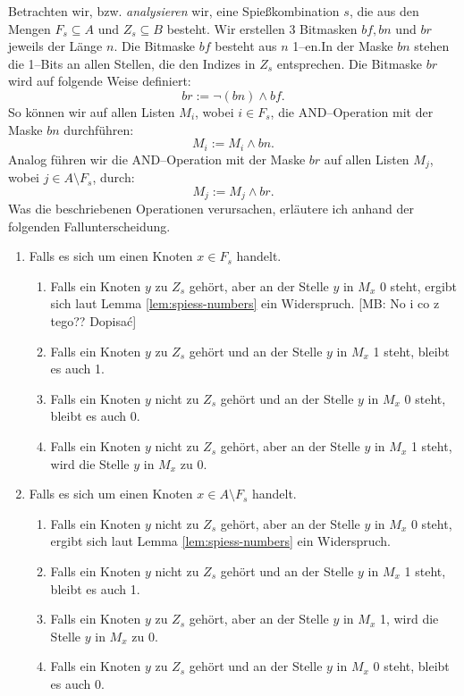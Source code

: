 \documentclass[a4paper,10pt,ngerman]{scrartcl}
\newcommand{\mb}[1]{{\color{red}[MB: #1]}}
\begin{document}
Betrachten wir, bzw. \textit{analysieren} wir, eine Spießkombination $s$, die aus den Mengen $F_s \subseteq A$ und $Z_s \subseteq B$ besteht. 
Wir erstellen 3 Bitmasken $bf, bn$ und $br$ jeweils der Länge $n$. Die Bitmaske $bf$ besteht aus $n$ 1--en.In der Maske $bn$ stehen die 1--Bits an allen Stellen, die den Indizes in $Z_s$ entsprechen.
Die Bitmaske $br$ wird auf folgende Weise definiert:
\[
br := \neg(bn) \land bf.
\]
\noindent So können wir auf allen Listen $M_i$, wobei $i \in F_s$, die AND--Operation mit der Maske $bn$ 
durchführen:
\[
M_i := M_i \land bn.
\]
Analog führen wir die AND--Operation mit der Maske $br$ auf allen Listen $M_j$,
wobei $j \in A \setminus F_s$, durch:
\[
M_j := M_j \land br.
\]
Was die beschriebenen Operationen verursachen, erläutere ich anhand der folgenden Fallunterscheidung.
\begin{enumerate}
  \item Falls es sich um einen Knoten $x \in F_s$ handelt.
  \begin{enumerate}
   \item Falls ein Knoten $y$ zu $Z_s$ gehört, aber an der Stelle $y$ in $M_x$ 0 steht, ergibt sich laut Lemma 
    \ref {lem:spiess-numbers} ein Widerspruch. \mb{No i co z tego?? Dopisać} 
   \item Falls ein Knoten $y$ zu $Z_s$ gehört und an der Stelle $y$ in $M_x$ 1 steht, bleibt es auch 1.
   \item Falls ein Knoten $y$ nicht zu $Z_s$ gehört und an der Stelle $y$ in $M_x$ 0 steht, bleibt es auch 0.
   \item Falls ein Knoten $y$ nicht zu $Z_s$ gehört, aber an der Stelle $y$ in $M_x$ 1 steht, 
    wird die Stelle $y$ in $M_x$ zu 0.
  \end{enumerate}
  \item Falls es sich um einen Knoten $x \in A \setminus F_s$ handelt.
  \begin{enumerate}
    \item Falls ein Knoten $y$ nicht zu $Z_s$ gehört, aber an der Stelle $y$ in $M_x$ 0 steht, ergibt sich 
      laut Lemma \ref {lem:spiess-numbers} ein Widerspruch.
    \item Falls ein Knoten $y$ nicht zu $Z_s$ gehört und an der Stelle $y$ in $M_x$ 1 steht, bleibt es auch 1.
    \item Falls ein Knoten $y$ zu $Z_s$ gehört, aber an der Stelle $y$ in $M_x$ 1, wird die Stelle 
      $y$ in $M_x$ zu 0.
    \item Falls ein Knoten $y$ zu $Z_s$ gehört und an der Stelle $y$ in $M_x$ 0 steht, bleibt es auch 0.
  \end{enumerate}
\end{enumerate}
\end{document}
